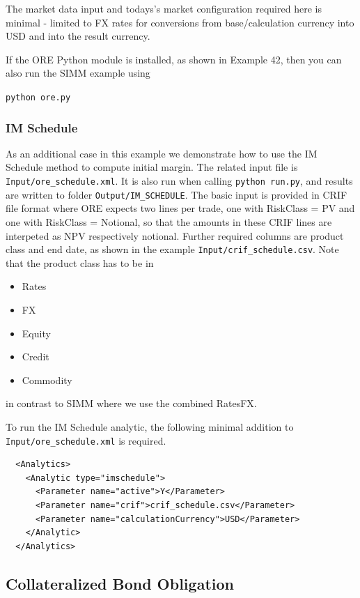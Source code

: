 The market data input and todays's market configuration required here is minimal - limited to FX rates for conversions from base/calculation currency into USD and into the result currency.

\bigskip
If the ORE Python module is installed, as shown in Example 42, then you can also run the SIMM example using

\medskip
\centerline{\tt python ore.py}

\subsubsection*{IM Schedule}

As an additional case in this example we demonstrate how to use the IM Schedule method to compute initial margin.
The related input file is {\tt Input/ore\_schedule.xml}. It is also run when calling {\tt python run.py}, and results are written to folder
{\tt Output/IM\_SCHEDULE}.
The basic input is provided in CRIF file format where ORE expects two lines per trade, one with RiskClass = PV and one with RiskClass = Notional,
so that the  amounts in these CRIF lines are interpeted as NPV respectively notional.
Further required columns are product class and end date, as shown in the example {\tt Input/crif\_schedule.csv}. Note that the product class has to be in
\begin{itemize}
  \item Rates
  \item FX
  \item Equity
  \item Credit
  \item Commodity
\end{itemize}
in contrast to SIMM where we use the combined RatesFX.

To run the IM Schedule analytic, the following minimal addition to {\tt Input/ore\_schedule.xml} is required.
\begin{verbatim}
  <Analytics>
    <Analytic type="imschedule">
      <Parameter name="active">Y</Parameter>
      <Parameter name="crif">crif_schedule.csv</Parameter>
      <Parameter name="calculationCurrency">USD</Parameter>
    </Analytic>
  </Analytics>
\end{verbatim}

\subsection{Collateralized Bond Obligation}%

